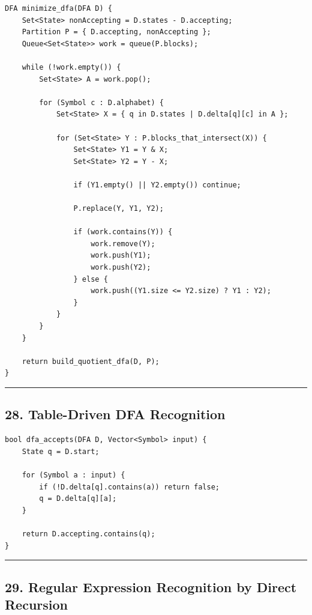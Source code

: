 \documentclass[10pt,letterpaper]{article}
\begin{document}
\begin{verbatim}
DFA minimize_dfa(DFA D) {
    Set<State> nonAccepting = D.states - D.accepting;
    Partition P = { D.accepting, nonAccepting };
    Queue<Set<State>> work = queue(P.blocks);

    while (!work.empty()) {
        Set<State> A = work.pop();

        for (Symbol c : D.alphabet) {
            Set<State> X = { q in D.states | D.delta[q][c] in A };

            for (Set<State> Y : P.blocks_that_intersect(X)) {
                Set<State> Y1 = Y & X;
                Set<State> Y2 = Y - X;

                if (Y1.empty() || Y2.empty()) continue;

                P.replace(Y, Y1, Y2);

                if (work.contains(Y)) {
                    work.remove(Y);
                    work.push(Y1);
                    work.push(Y2);
                } else {
                    work.push((Y1.size <= Y2.size) ? Y1 : Y2);
                }
            }
        }
    }

    return build_quotient_dfa(D, P);
}
\end{verbatim}

\medskip\hrule\medskip

\subsection*{28. Table-Driven DFA Recognition}

\begin{verbatim}
bool dfa_accepts(DFA D, Vector<Symbol> input) {
    State q = D.start;

    for (Symbol a : input) {
        if (!D.delta[q].contains(a)) return false;
        q = D.delta[q][a];
    }

    return D.accepting.contains(q);
}
\end{verbatim}

\medskip\hrule\medskip

\subsection*{29. Regular Expression Recognition by Direct Recursion}
\end{document}
